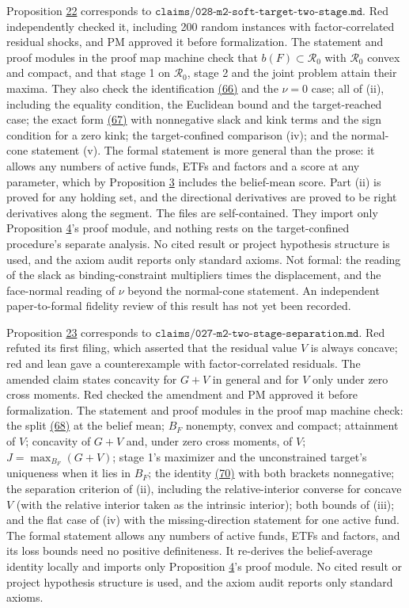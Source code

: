 \documentclass[11pt]{article}
\begin{document}
Proposition \hyperref[res:Proposition-22]{22} corresponds to
\(\texttt{claims/028-m2-soft-target-two-stage.md}\). Red
independently checked it, including 200 random instances with
factor-correlated residual shocks, and PM approved it before
formalization. The statement and proof modules in the proof map
machine check that \(b(F)\subset\mathcal R_0\) with
\(\mathcal R_0\) convex and compact, and that stage 1 on
\(\mathcal R_0\), stage 2 and the joint problem attain their
maxima. They also check the identification \hyperref[eq:66]{(66)} and the \(\nu=0\)
case; all of (ii), including the equality condition, the Euclidean
bound and the target-reached case; the exact form \hyperref[eq:67]{(67)} with
nonnegative slack and kink terms and the sign condition for a zero
kink; the target-confined comparison (iv); and the normal-cone
statement (v). The formal statement is more general than the
prose: it allows any numbers of active funds, ETFs and factors and
a score at any parameter, which by Proposition \hyperref[res:Proposition-3]{3} includes the
belief-mean score. Part (ii) is proved for any holding set, and the
directional derivatives are proved to be right derivatives along
the segment. The files are self-contained. They import only
Proposition \hyperref[res:Proposition-4]{4}'s proof module, and nothing rests on the
target-confined procedure's separate analysis. No cited result or
project hypothesis structure is used, and the axiom audit reports
only standard axioms. Not formal: the reading of the slack as
binding-constraint multipliers times the displacement, and the
face-normal reading of \(\nu\) beyond the normal-cone statement.
An independent paper-to-formal fidelity review of this result has
not yet been recorded.

Proposition \hyperref[res:Proposition-23]{23} corresponds to
\(\texttt{claims/027-m2-two-stage-separation.md}\). Red
refuted its first filing, which asserted that the residual value
\(V\) is always concave; red and lean gave a counterexample with
factor-correlated residuals. The amended claim states concavity
for \(G+V\) in general and for \(V\) only under zero cross
moments. Red checked the amendment and PM approved it before
formalization. The statement and proof modules in the proof map
machine check: the split \hyperref[eq:68]{(68)} at the belief mean; \(B_F\) nonempty,
convex and compact; attainment of \(V\); concavity of \(G+V\) and,
under zero cross moments, of \(V\); \(J=\max_{B_F}(G+V)\); stage 1's
maximizer and the unconstrained target's uniqueness when it lies in
\(B_F\); the identity \hyperref[eq:70]{(70)} with both brackets nonnegative; the
separation criterion of (ii), including the relative-interior
converse for concave \(V\) (with the relative interior taken as the
intrinsic interior); both bounds of (iii); and the flat case of (iv)
with the missing-direction statement for one active fund. The formal
statement allows any numbers of active funds, ETFs and factors, and
its loss bounds need no positive definiteness. It re-derives the
belief-average identity locally and imports only Proposition \hyperref[res:Proposition-4]{4}'s
proof module. No cited result or project hypothesis structure is
used, and the axiom audit reports only standard axioms.
\end{document}
